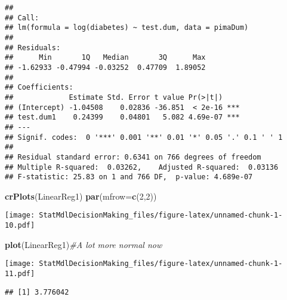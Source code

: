 \documentclass[
]{article}
\newenvironment{Shaded}{\begin{snugshade}}{\end{snugshade}}
\newcommand{\AttributeTok}[1]{\textcolor[rgb]{0.13,0.29,0.53}{#1}}
\newcommand{\CommentTok}[1]{\textcolor[rgb]{0.56,0.35,0.01}{\textit{#1}}}
\newcommand{\DecValTok}[1]{\textcolor[rgb]{0.00,0.00,0.81}{#1}}
\newcommand{\FunctionTok}[1]{\textcolor[rgb]{0.13,0.29,0.53}{\textbf{#1}}}
\newcommand{\NormalTok}[1]{#1}
\newcommand{\SpecialCharTok}[1]{\textcolor[rgb]{0.81,0.36,0.00}{\textbf{#1}}}
\begin{document}
\begin{verbatim}
## 
## Call:
## lm(formula = log(diabetes) ~ test.dum, data = pimaDum)
## 
## Residuals:
##      Min       1Q   Median       3Q      Max 
## -1.62933 -0.47994 -0.03252  0.47709  1.89052 
## 
## Coefficients:
##             Estimate Std. Error t value Pr(>|t|)    
## (Intercept) -1.04508    0.02836 -36.851  < 2e-16 ***
## test.dum1    0.24399    0.04801   5.082 4.69e-07 ***
## ---
## Signif. codes:  0 '***' 0.001 '**' 0.01 '*' 0.05 '.' 0.1 ' ' 1
## 
## Residual standard error: 0.6341 on 766 degrees of freedom
## Multiple R-squared:  0.03262,    Adjusted R-squared:  0.03136 
## F-statistic: 25.83 on 1 and 766 DF,  p-value: 4.689e-07
\end{verbatim}

\begin{Shaded}
\begin{Highlighting}[]
      \FunctionTok{crPlots}\NormalTok{(LinearReg1)}
      \FunctionTok{par}\NormalTok{(}\AttributeTok{mfrow=}\FunctionTok{c}\NormalTok{(}\DecValTok{2}\NormalTok{,}\DecValTok{2}\NormalTok{))}
\end{Highlighting}
\end{Shaded}

\texttt{[image: StatMdlDecisionMaking\_files/figure-latex/unnamed-chunk-1-10.pdf]}

\begin{Shaded}
\begin{Highlighting}[]
      \FunctionTok{plot}\NormalTok{(LinearReg1)}\CommentTok{\#A lot more normal now}
\end{Highlighting}
\end{Shaded}

\texttt{[image: StatMdlDecisionMaking\_files/figure-latex/unnamed-chunk-1-11.pdf]}

\begin{Shaded}
\end{Shaded}

\begin{verbatim}
## [1] 3.776042
\end{verbatim}
\end{document}
